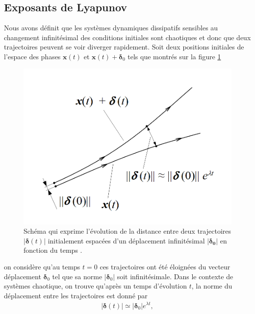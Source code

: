 \subsection{Exposants de Lyapunov} \label{subsec: lyapunov}
    Nous avons définit que les systèmes dynamiques dissipatifs sensibles au
    changement infinitésimal des conditions initiales sont chaotiques et donc
    que deux trajectoires peuvent se voir diverger rapidement. Soit deux
    positions initiales de l'espace des phases $\bm{x}(t)$ et $\bm{x}(t) +
    \bm{\delta}_0$ tels que montrés sur la figure \ref{fig: theo_lyapunov}
    \begin{figure}[h!]
        \centering
        \includegraphics[scale=0.3]{figs/Orbital_instability_(Lyapunov_exponent).png}
        \caption{Schéma qui exprime l'évolution de la distance entre deux
        trajectoires $|\bm{\delta}(t)|$ initialement espacées d'un déplacement
    infinitésimal $|\bm{\delta_0}|$ en fonction du temps \cite{LEs_wiki}.}
        \label{fig: theo_lyapunov}
    \end{figure}

    on considère qu'au temps $t=0$ ces trajectoires ont été éloignées du
    vecteur déplacement $\bm{\delta}_0$ tel que sa norme $|\bm{\delta}_0|$ soit
    infinitésimale. Dans le contexte de systèmes chaotique, on trouve qu'après
    un temps d'évolution $t$, la norme du déplacement entre les trajectoires
    est donné par
    \begin{align}
        |\bm{\delta}(t)| \simeq |\bm{\delta}_0|e^{\lambda t},
        \label{eq : lyapunov_delta}
    \end{align}

